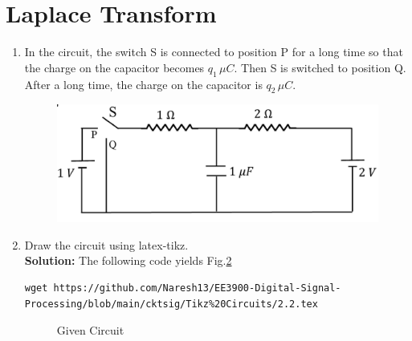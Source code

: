 \documentclass[journal,12pt,twocolumn]{IEEEtran}
\newcommand{\solution}{\noindent \textbf{Solution: }}
\numberwithin{equation}{section}
\renewcommand\thesection{\arabic{section}}
\begin{document}
 \section{Laplace Transform}
\begin{enumerate}[label=\arabic*.,ref=\thesection.\theenumi]
\item In the circuit, the switch S is connected to position P for a long time so that the charge on the capacitor
	becomes $q_1 \, \mu C$. Then S is switched to position Q.  After a long time, the charge on the capacitor is
		$q_2 \, \mu C$.
		\begin{figure}[!ht]
			\centering
			\includegraphics[width=\columnwidth]{figs/ckt.jpg}
			\caption{}
			\label{fig:ckt}
\end{figure}
\item Draw the circuit using latex-tikz.\\
\solution The following code yields Fig.\ref{fig:qn}
\begin{lstlisting}
wget https://github.com/Naresh13/EE3900-Digital-Signal-Processing/blob/main/cktsig/Tikz%20Circuits/2.2.tex
\end{lstlisting}
\begin{figure}[!ht]
 \centering
  
\caption{Given Circuit}
\label{fig:qn}
\end{figure}


\end{enumerate}
\end{document}
